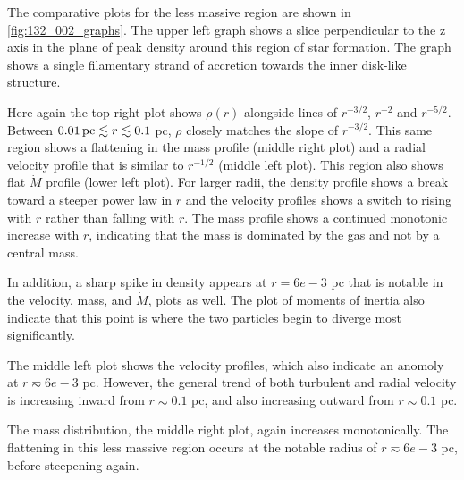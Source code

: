 \documentclass{emulateapj}
\begin{document}
The comparative plots for the less massive region are shown in \ref{fig:132_002_graphs}.  The upper left graph shows a slice perpendicular to the z axis in the plane of peak density around this region of star formation.  The graph shows a single filamentary strand of accretion towards the inner disk-like structure.  

Here again the top right plot shows $\rho(r)$ alongside lines of $r^{-3/2}$, $r^{-2}$ and $r^{-5/2}$.  Between $0.01\,{\rm pc} \lesssim r \lesssim 0.1$ pc, $\rho$ closely matches the slope of $r^{-3/2}$.  This same region shows a flattening in the mass profile (middle right plot) and a radial velocity profile that is similar to $r^{-1/2}$ (middle left plot).  This region also shows flat $\dot{M}$ profile (lower left plot).  For larger radii, the density profile shows a break toward a steeper power law in $r$ and the velocity profiles shows a switch to rising with $r$ rather than falling with $r$.  The mass profile shows a continued monotonic increase with $r$, indicating that the mass is dominated by the gas and not by a central mass.  

In addition, a sharp spike in density appears at $r = 6e-3$ pc that is notable in the velocity, mass, and $\dot M$, plots as well.  The plot of moments of inertia also indicate that this point is where the two particles begin to diverge most significantly. 

The middle left plot shows the velocity profiles, which also indicate an anomoly at $r \eqsim 6e-3$ pc.  However, the general trend of both turbulent and radial velocity is increasing inward from $r \eqsim 0.1$ pc, and also increasing outward from $r \eqsim 0.1$ pc.

The mass distribution, the middle right plot, again increases monotonically.  The flattening in this less massive region occurs at the notable radius of $r \eqsim 6e-3$ pc, before steepening again.           


\end{document}
